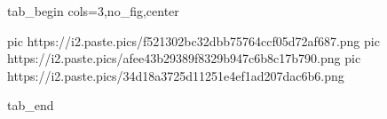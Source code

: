  
 
 
 
 


\ifcmt
  tab_begin cols=3,no_fig,center

     pic https://i2.paste.pics/f521302bc32dbb75764ccf05d72af687.png
		 pic https://i2.paste.pics/afee43b29389f8329b947c6b8c17b790.png
		 pic https://i2.paste.pics/34d18a3725d11251e4ef1ad207dac6b6.png

  tab_end
\fi
